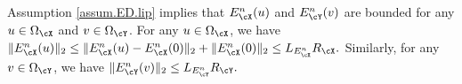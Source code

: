 \documentclass[11pt]{article} %
\newcommand{\commentout}[1]{}
\begin{document}
	\commentout{
\begin{enumerate}[(i)]
	\item Zero element
	\begin{align*}
		&E_{\cX}(0)=\mathbf{0},\ D_{\cX}(\mathbf{0})=0,\ E_{\cY}(0)=\mathbf{0},\ D_{\cY}(\mathbf{0})=0,\\
		&E^n_{\cX}(0)=\mathbf{0},\ D^n_{\cX}(\mathbf{0})=0,\ E^n_{\cY}(0)=\mathbf{0},\ D^n_{\cY}(\mathbf{0})=0,
	\end{align*}
	\item There exist $L_{E_{\cX}},L_{D_{\cX}} >0$ such that for any $u_1,u_2\in \cX$ and any $\ab_1,\ab_2\in \RR^{d_{\cX}}$, we have
	\begin{align*}
		&\|E_{\cX}(u_1)-E_{\cX}(u_2)\|_{2}\leq L_{E_{\cX}}\|u_1-u_2\|_{\cX}, \quad \|E_{\cX}^n(u_1)-E_{\cX}^n(u_2)\|_{2}\leq L_{E_{\cX}}\|u_1-u_2\|_{\cX},\\
		&\|D_{\cX}(\ab_1)-D_{\cX}(\ab_2)\|_{\cX}\leq L_{D_{\cX}}\|\ab_1-\ab_2\|_2, \quad \|D_{\cX}^n(\ab_1)-D_{\cX}^n(\ab_2)\|_{\cX}\leq L_{D_{\cX}}\|\ab_1-\ab_2\|_2.
	\end{align*}
	
	Assume there exist $L_{E_{\cY}},L_{D_{\cY}} >0$ such that for any $v_1,v_2\in \cY$ and  any $\ab_1,\ab_2\in \RR^{d_{\cY}}$, we have
	\begin{align*}
		&\|E_{\cY}(v_1)-E_{\cY}(v_2)\|_{2}\leq L_{E_{\cY}}\|v_1-v_2\|_{\cY}, \quad \|E_{\cY}^n(v_1)-E_{\cY}^n(v_2)\|_{2}\leq L_{E_{\cY}}\|u_1-u_2\|_{\cY},\\
		&\|D_{\cY}(\ab_1)-D_{\cY}(\ab_2)\|_{\cY}\leq L_{D_{\cY}}\|\ab_1-\ab_2\|_2, \quad \|D_{\cY}^n(\ab_1)-D_{\cY}^n(\ab_2)\|_{\cY}\leq L_{D_{\cY}}\|\ab_1-\ab_2\|_2.
	\end{align*}
\end{enumerate}
}
		 	

Assumption \ref{assum.ED.lip} implies that $E^n_{\cX}(u)$ and $E^n_{\cY}(v)$ are bounded for any $u\in \Omega_{\cX}$ and $v\in\Omega_{\cY}$.
For any $u\in \Omega_{\cX}$, we have
$	\|E^n_{\cX }(u)\|_{2}	\leq \|E^n_{\cX }(u)-E^n_{\cX}(0)\|_{2}+\|E^n_{\cX}(0)\|_{2}	\leq  L_{E^n_{\cX}}R_{\cX}.$
Similarly, for any $v\in\Omega_{\cY}$, we have
$
 \|E_{\cY }^n(v)\|_{2}\leq L_{E_{\cY}^n}R_{\cY}.
$
\end{document}
